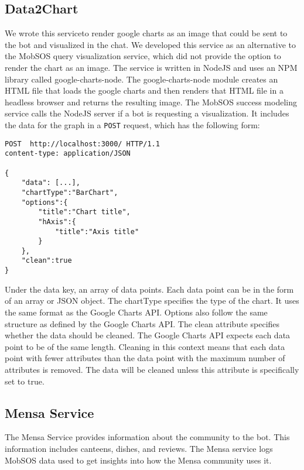 \subsection{Data2Chart}
We wrote this service\footnotemark to render google charts as an image that could be sent to the bot and visualized in the chat. We developed this service as an alternative to the MobSOS query visualization service, which did not provide the option to render the chart as an image. 
The service is written in NodeJS and uses an NPM library called google-charts-node\footnotemark.
The google-charts-node module creates an HTML file that loads the google charts and then renders that HTML file in a headless browser \footnotemark and returns the resulting image.
The MobSOS success modeling service calls the NodeJS server if a bot is requesting a visualization. It includes the data for the graph in a \texttt{POST} request, which has the following form:
\begin{lstlisting}
POST  http://localhost:3000/ HTTP/1.1
content-type: application/JSON

{
    "data": [...],
    "chartType":"BarChart",
    "options":{
        "title":"Chart title",
        "hAxis":{
            "title":"Axis title"
        }
    },
    "clean":true 
}
\end{lstlisting}
Under the data key, an array of data points. Each data point can be in the form of an array or JSON object. 
The chartType specifies the type of the chart. It uses the same format as the Google Charts API. 
Options also follow the same structure as defined by the Google Charts API.
The clean attribute specifies whether the data should be cleaned. The Google Charts API expects each data point to be of the same length. Cleaning in this context means that each data point with fewer attributes than the data point with the maximum number of attributes is removed.
The data will be cleaned unless this attribute is specifically set to true.  

\subsection{Mensa Service}
The Mensa Service provides information about the community to the bot. This information includes canteens, dishes, and reviews. The Mensa service logs MobSOS data used to get insights into how the Mensa community uses it.

